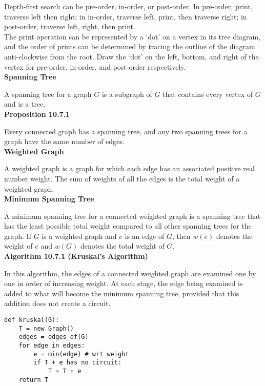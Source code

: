 \documentclass[a4paper]{article}
\newcommand{\subheading}[1]{{\scriptsize\textbf{#1}}}
\begin{document}
\begin{multicols*}{4}
Depth-first search can be pre-order, in-order, or post-order. In pre-order,
print, traverse left then right; in in-order, traverse left, print, then
traverse right; in post-order, traverse left, right, then print. \\

The print operation can be represented by a `dot' on a vertex in its tree
diagram, and the order of prints can be determined by tracing the outline of the
diagram anti-clockwise from the root. Draw the `dot' on the left, bottom, and
right of the vertex for pre-order, in-order, and post-order respectively. \\

\subheading{Spanning Tree}

A spanning tree for a graph $G$ is a subgraph of $G$ that contains every vertex
of $G$ and is a tree.\\

\subheading{Proposition 10.7.1}

Every connected graph has a spanning tree, and any two spanning trees for a
graph have the same number of edges.\\

\subheading{Weighted Graph}

A weighted graph is a graph for which each edge has an associated positive real
number weight. The sum of weights of all the edges is the total weight of a
weighted graph.\\

\subheading{Minimum Spanning Tree}

A minimum spanning tree for a connected weighted graph is a spanning tree that
has the least possible total weight compared to all other spanning trees for the
graph. If $G$ is a weighted graph and $e$ is an edge of $G$, then $w(e)$ denotes
the weight of $e$ and $w(G)$ denotes the total weight of $G$.\\

\subheading{Algorithm 10.7.1 (Kruskal's Algorithm)}

In this algorithm, the edges of a connected weighted graph are examined one by
one in order of increasing weight. At each stage, the edge being examined is
added to what will become the minimum spanning tree, provided that this addition
does not create a circuit.
\begin{center}
\begin{BVerbatim}
def kruskal(G):
    T = new Graph()
    edges = edges_of(G)
    for edge in edges:
        e = min(edge) # wrt weight
        if T + e has no circuit:
            T = T + e
    return T
\end{BVerbatim}
\end{center}


\end{multicols*}
\end{document}
